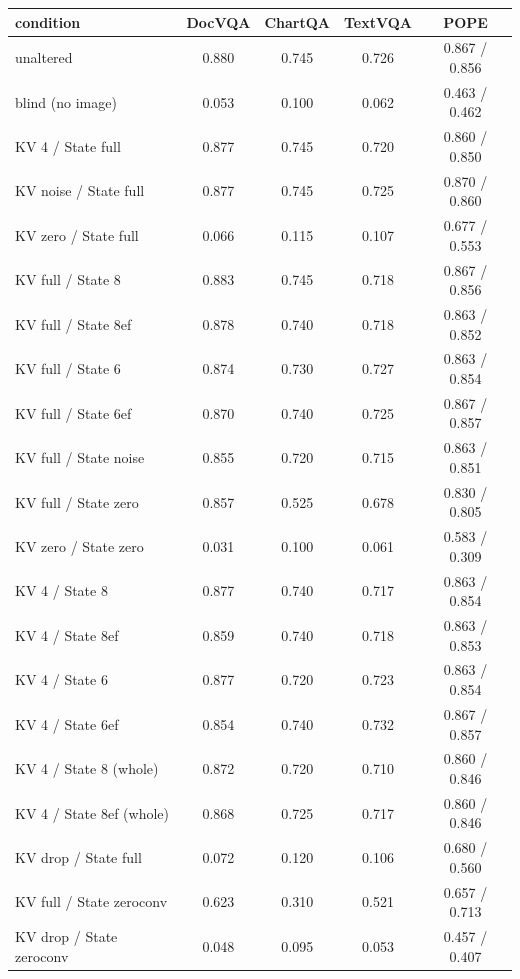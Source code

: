 \begin{tabular}{lcccc}
\toprule
condition & DocVQA & ChartQA & TextVQA & POPE \\
\midrule
unaltered & 0.880 & 0.745 & 0.726 & 0.867 / 0.856 \\
blind (no image) & 0.053 & 0.100 & 0.062 & 0.463 / 0.462 \\
KV 4 / State full & 0.877 & 0.745 & 0.720 & 0.860 / 0.850 \\
KV noise / State full & 0.877 & 0.745 & 0.725 & 0.870 / 0.860 \\
KV zero / State full & 0.066 & 0.115 & 0.107 & 0.677 / 0.553 \\
KV full / State 8 & 0.883 & 0.745 & 0.718 & 0.867 / 0.856 \\
KV full / State 8ef & 0.878 & 0.740 & 0.718 & 0.863 / 0.852 \\
KV full / State 6 & 0.874 & 0.730 & 0.727 & 0.863 / 0.854 \\
KV full / State 6ef & 0.870 & 0.740 & 0.725 & 0.867 / 0.857 \\
KV full / State noise & 0.855 & 0.720 & 0.715 & 0.863 / 0.851 \\
KV full / State zero & 0.857 & 0.525 & 0.678 & 0.830 / 0.805 \\
KV zero / State zero & 0.031 & 0.100 & 0.061 & 0.583 / 0.309 \\
KV 4 / State 8 & 0.877 & 0.740 & 0.717 & 0.863 / 0.854 \\
KV 4 / State 8ef & 0.859 & 0.740 & 0.718 & 0.863 / 0.853 \\
KV 4 / State 6 & 0.877 & 0.720 & 0.723 & 0.863 / 0.854 \\
KV 4 / State 6ef & 0.854 & 0.740 & 0.732 & 0.867 / 0.857 \\
KV 4 / State 8 (whole) & 0.872 & 0.720 & 0.710 & 0.860 / 0.846 \\
KV 4 / State 8ef (whole) & 0.868 & 0.725 & 0.717 & 0.860 / 0.846 \\
KV drop / State full & 0.072 & 0.120 & 0.106 & 0.680 / 0.560 \\
KV full / State zeroconv & 0.623 & 0.310 & 0.521 & 0.657 / 0.713 \\
KV drop / State zeroconv & 0.048 & 0.095 & 0.053 & 0.457 / 0.407 \\
\bottomrule
\end{tabular}
